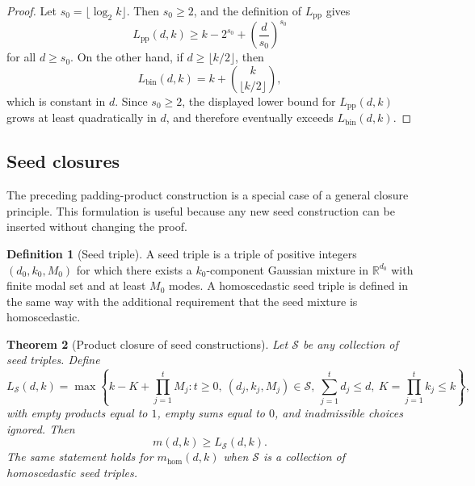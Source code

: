 \documentclass[11pt]{article}
\theoremstyle{plain}
\newtheorem{theorem}{Theorem}[section]
\theoremstyle{definition}
\newtheorem{definition}[theorem]{Definition}
\theoremstyle{remark}
\numberwithin{equation}{section}
\newcommand{\R}{\mathbb{R}}
\begin{document}
\begin{proof}
Let $s_0=\lfloor \log_2 k\rfloor$. Then $s_0\ge 2$, and the definition of $L_{\mathrm{pp}}$ gives
\[
L_{\mathrm{pp}}(d,k)\ge k-2^{s_0}+\left(\frac{d}{s_0}\right)^{s_0}
\]
for all $d\ge s_0$. On the other hand, if $d\ge \lfloor k/2\rfloor$, then
\[
L_{\mathrm{bin}}(d,k)=k+\binom{k}{\lfloor k/2\rfloor},
\]
which is constant in $d$. Since $s_0\ge 2$, the displayed lower bound for $L_{\mathrm{pp}}(d,k)$ grows at least quadratically in $d$, and therefore eventually exceeds $L_{\mathrm{bin}}(d,k)$.
\end{proof}

\subsection{Seed closures}\label{subsec:seed-closures}

The preceding padding-product construction is a special case of a general closure principle. This formulation is useful because any new seed construction can be inserted without changing the proof.

\begin{definition}[Seed triple]
A seed triple is a triple of positive integers $(d_0,k_0,M_0)$ for which there exists a $k_0$-component Gaussian mixture in $\R^{d_0}$ with finite modal set and at least $M_0$ modes. A homoscedastic seed triple is defined in the same way with the additional requirement that the seed mixture is homoscedastic.
\end{definition}

\begin{theorem}[Product closure of seed constructions]\label{thm:seed-closure}
Let $\mathcal S$ be any collection of seed triples. Define
\[
L_{\mathcal S}(d,k)=
\max\left\{
 k-K+\prod_{j=1}^t M_j:
 t\ge0,\ 
 (d_j,k_j,M_j)\in\mathcal S,\ 
 \sum_{j=1}^t d_j\le d,\ 
 K=\prod_{j=1}^t k_j\le k
\right\},
\]
with empty products equal to $1$, empty sums equal to $0$, and inadmissible choices ignored. Then
\[
m(d,k)\ge L_{\mathcal S}(d,k).
\]
The same statement holds for $m_{\mathrm{hom}}(d,k)$ when $\mathcal S$ is a collection of homoscedastic seed triples.
\end{theorem}
\end{document}
